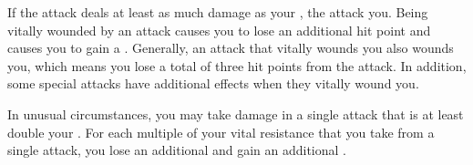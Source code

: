     If the attack deals at least as much damage as your , the attack  you.
    Being vitally wounded by an attack causes you to lose an additional hit point and causes you to gain a .
    Generally, an attack that vitally wounds you also wounds you, which means you lose a total of three hit points from the attack.
    In addition, some special attacks have additional effects when they vitally wound you.

        In unusual circumstances, you may take damage in a single attack that is at least double your .
        For each multiple of your vital resistance that you take from a single attack, you lose an additional  and gain an additional .

